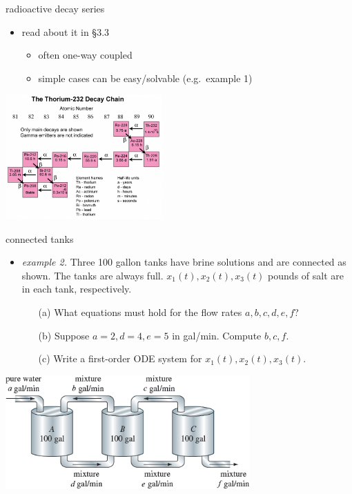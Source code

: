\documentclass[dvipsnames,colorlinks]{beamer}
\begin{document}
\begin{frame}{radioactive decay series}

\begin{itemize}
\item read about it in \S3.3

    \begin{itemize}
    \item often one-way coupled
    \item simple cases can be easy/solvable (e.g.~example 1)
    \end{itemize}
\end{itemize}

\bigskip
\begin{center}
\includegraphics[width=0.45\textwidth]{figs/thorium232-decay}
\end{center}
\end{frame}


\begin{frame}{connected tanks}

\begin{itemize}
\item \emph{example 2.}  Three 100 gallon tanks have brine solutions and are connected as shown.  The tanks are always full.  $x_1(t),x_2(t),x_3(t)$ pounds of salt are in each tank, respectively.
    \begin{itemize}
    \item[(a)] What equations must hold for the flow rates $a,b,c,d,e,f$?
    \item[(b)] Suppose $a=2,d=4,e=5$ in gal/min.  Compute $b,c,f$.
    \item[(c)] Write a first-order ODE system for $x_1(t),x_2(t),x_3(t)$.
    \end{itemize}
\end{itemize}

\begin{center}
\includegraphics[width=0.7\textwidth]{figs/three-tanks}
\end{center}
\end{frame}
\end{document}
